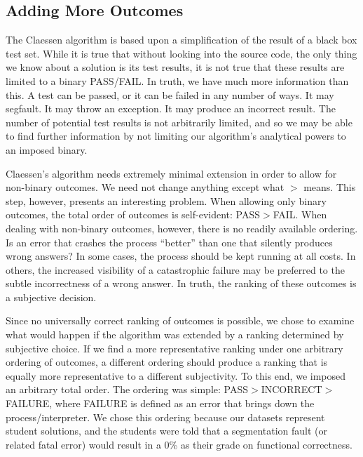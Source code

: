 \documentclass[11pt]{article}
\begin{document}
\subsection{Adding More Outcomes}
The Claessen algorithm is based upon a simplification of the result of a black box test set. While it is true that without looking into the source code, the only thing we know about a solution is its test results, it is not true that these results are limited to a binary PASS/FAIL. In truth, we have much more information than this. A test can be passed, or it can be failed in any  number of ways. It may segfault. It may throw an exception. It may produce an incorrect result. The number of potential test results is not arbitrarily limited, and so we may be able to find further information by not limiting our algorithm's analytical powers to an imposed binary.

Claessen's algorithm needs extremely minimal extension in order to allow for non-binary outcomes. We need not change anything except what $>$ means. This step, however, presents an interesting problem. When allowing only binary outcomes, the total order of outcomes is self-evident: PASS$>$FAIL. When dealing with non-binary outcomes, however, there is no readily available ordering. Is an error that crashes the process ``better'' than one that silently produces wrong answers? In some cases, the process should be kept running at all costs. In others, the increased visibility of a catastrophic failure may be preferred to the subtle incorrectness of a wrong answer. In truth, the ranking of these outcomes is a subjective decision.

Since no universally correct ranking of outcomes is possible, we chose to examine what would happen if the algorithm was extended by a ranking determined by subjective choice. If we find a more representative ranking under one arbitrary ordering of outcomes, a different ordering should produce a ranking that is equally more representative to a different subjectivity. To this end, we imposed an arbitrary total order. The ordering was simple: PASS$>$INCORRECT$>$FAILURE, where FAILURE is defined as an error that brings down the process/interpreter. We chose this ordering because our datasets represent student solutions, and the students were told that a segmentation fault (or related fatal error) would result in a 0\% as their grade on functional correctness.
\end{document}
